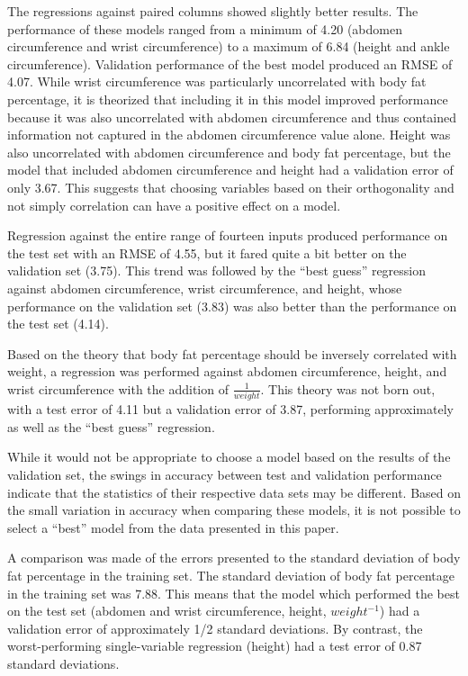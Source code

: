 \documentclass{IEEEtran}
\begin{document}
The regressions against paired columns showed slightly better results. The performance of these models ranged from a minimum of 4.20 (abdomen circumference and wrist circumference) to a maximum of 6.84 (height and ankle circumference). Validation performance of the best model produced an RMSE of 4.07. While wrist circumference was particularly uncorrelated with body fat percentage, it is theorized that including it in this model improved performance because it was also uncorrelated with abdomen circumference and thus contained information not captured in the abdomen circumference value alone. Height was also uncorrelated with abdomen circumference and body fat percentage, but the model that included abdomen circumference and height had a validation error of only 3.67. This suggests that choosing variables based on their orthogonality and not simply correlation can have a positive effect on a model.

Regression against the entire range of fourteen inputs produced performance on the test set with an RMSE of 4.55, but it fared quite a bit better on the validation set (3.75). This trend was followed by the ``best guess'' regression against abdomen circumference, wrist circumference, and height, whose performance on the validation set (3.83) was also better than the performance on the test set (4.14).

Based on the theory that body fat percentage should be inversely correlated with weight, a regression was performed against abdomen circumference, height, and wrist circumference with the addition of $\frac{1}{weight}$. This theory was not born out, with a test error of 4.11 but a validation error of 3.87, performing approximately as well as the ``best guess'' regression.

While it would not be appropriate to choose a model based on the results of the validation set, the swings in accuracy between test and validation performance indicate that the statistics of their respective data sets may be different. Based on the small variation in accuracy when comparing these models, it is not possible to select a ``best'' model from the data presented in this paper. 

A comparison was made of the errors presented to the standard deviation of body fat percentage in the training set. The standard deviation of body fat percentage in the training set was 7.88. This means that the model which performed the best on the test set (abdomen and wrist circumference, height, $weight^{-1}$) had a validation error of approximately 1/2 standard deviations. By contrast, the worst-performing single-variable regression (height) had a test error of 0.87 standard deviations.
\end{document}
